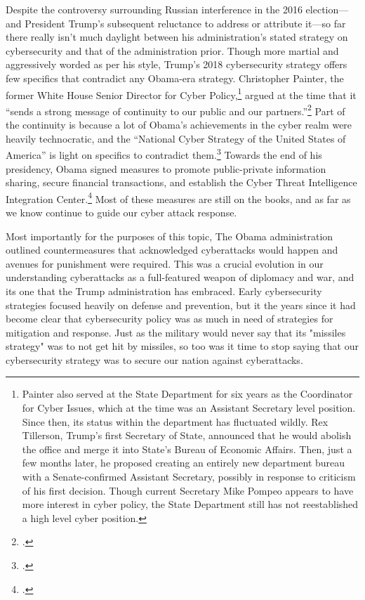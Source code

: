 \documentclass{report}
\begin{document}
\begin{refsegment}
Despite the controversy surrounding Russian interference in the 2016 election---and President Trump's subsequent reluctance to address or attribute it---so far there really isn't much daylight between his administration's stated strategy on cybersecurity and that of the administration prior. Though more martial and aggressively worded as per his style, Trump's 2018 cybersecurity strategy offers few specifics that contradict any Obama-era strategy. Christopher Painter, the former White House Senior Director for Cyber Policy,\footnote{Painter also served at the State Department for six years as the Coordinator for Cyber Issues, which at the time was an Assistant Secretary level position. Since then, its status within the department has fluctuated wildly. Rex Tillerson, Trump's first Secretary of State, announced that he would abolish the office and merge it into State's Bureau of Economic Affairs. Then, just a few months later, he proposed creating an entirely new department bureau with a Senate-confirmed Assistant Secretary, possibly in response to criticism of his first decision. Though current Secretary Mike Pompeo appears to have more interest in cyber policy, the State Department still has not reestablished a high level cyber position.} argued at the time that it ``sends a strong message of continuity to our public and our partners.''\footcite{painter_white_2018} Part of the continuity is because a lot of Obama's achievements in the cyber realm were heavily technocratic, and the ``National Cyber Strategy of the United States of America'' is light on specifics to contradict them.\footcite{guest_blogger_white_2018} Towards the end of his presidency, Obama signed measures to promote public-private information sharing, secure financial transactions, and establish the Cyber Threat Intelligence Integration Center.\footcite[Among other actions taken during the Obama presidency, these were sufficenct for PolitiFact to update its 2013 rating of his promise to ``Promise Kept.'']{carroll_obama_2016} Most of these measures are still on the books, and as far as we know continue to guide our cyber attack response.

Most importantly for the purposes of this topic, The Obama administration outlined countermeasures that acknowledged cyberattacks would happen and avenues for punishment were required. This was a crucial evolution in our understanding cyberattacks as a full-featured weapon of diplomacy and war, and its one that the Trump administration has embraced. Early cybersecurity strategies focused heavily on defense and prevention, but it the years since it had become clear that cybersecurity policy was as much in need of strategies for mitigation and response. Just as the military would never say that its "missiles strategy" was to not get hit by missiles, so too was it time to stop saying that our cybersecurity strategy was to secure our nation against cyberattacks.


\end{refsegment}
\end{document}
